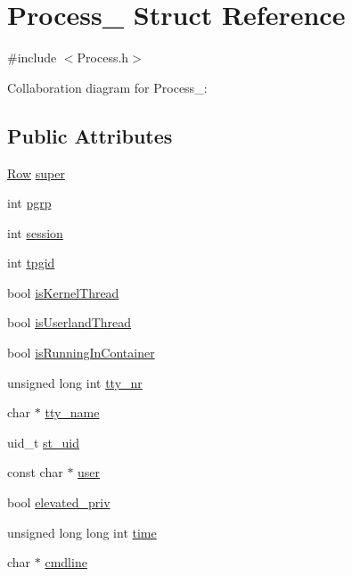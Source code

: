 \hypertarget{structProcess__}{}\section{Process\+\_\+ Struct Reference}
\label{structProcess__}


{\ttfamily \#include $<$Process.\+h$>$}



Collaboration diagram for Process\+\_\+\+:
\subsection*{Public Attributes}
\begin{DoxyCompactItemize}
\item 
\hyperlink{Row_8h_a54193344854aa79a97448ca03062e70c}{Row} \hyperlink{structProcess___a09ae30bf69354e5c7b62ba18e99112b9}{super}
\item 
int \hyperlink{structProcess___a603513457ee08c63031438a1efd6a53b}{pgrp}
\item 
int \hyperlink{structProcess___ad5375b57b318bbf9ce73c15fe189ee9b}{session}
\item 
int \hyperlink{structProcess___a48484f43dd41bddbe7aeeb2c6127720a}{tpgid}
\item 
bool \hyperlink{structProcess___a4274f70af5fc9b32d72bc01c78e3d3c9}{is\+Kernel\+Thread}
\item 
bool \hyperlink{structProcess___a5e0490e694a0981184a34b94d1ebaba5}{is\+Userland\+Thread}
\item 
bool \hyperlink{structProcess___af72c9dc7d0db85ac99d5c28d543da268}{is\+Running\+In\+Container}
\item 
unsigned long int \hyperlink{structProcess___a7b2c3c111d0c52fe143337283351f2f6}{tty\+\_\+nr}
\item 
char $\ast$ \hyperlink{structProcess___a6eebc460195aa2613278e4bed179dcac}{tty\+\_\+name}
\item 
uid\+\_\+t \hyperlink{structProcess___aa8670880f345d7fa09d96aec7b2f99c1}{st\+\_\+uid}
\item 
const char $\ast$ \hyperlink{structProcess___ab7567f24054af86f369d28e35e33e38f}{user}
\item 
bool \hyperlink{structProcess___a1e05af5ca1ccc752a0b75c7ea20491ab}{elevated\+\_\+priv}
\item 
unsigned long long int \hyperlink{structProcess___a450ede65d286d1d1300fcacd1aad3cc9}{time}
\item 
char $\ast$ \hyperlink{structProcess___a75b9c0708db9da46eb061bf0b68ca499}{cmdline}

\end{DoxyCompactItemize}
